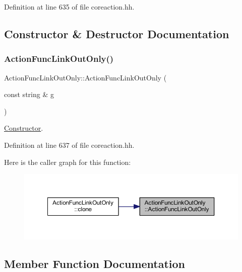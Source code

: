 Definition at line 635 of file coreaction.\+hh.



\subsection{Constructor \& Destructor Documentation}
\mbox{\label{class_action_func_link_out_only_a4c4097e870218f70d23a848a1e79fb78}} 
\subsubsection{\texorpdfstring{ActionFuncLinkOutOnly()}{ActionFuncLinkOutOnly()}}
{\footnotesize\ttfamily Action\+Func\+Link\+Out\+Only\+::\+Action\+Func\+Link\+Out\+Only (\begin{DoxyParamCaption}\item[{const string \&}]{g }\end{DoxyParamCaption})\hspace{0.3cm}{\ttfamily [inline]}}



\mbox{\hyperlink{class_constructor}{Constructor}}. 



Definition at line 637 of file coreaction.\+hh.

Here is the caller graph for this function\+:
\nopagebreak
\begin{figure}[H]
\begin{center}
\leavevmode
\includegraphics[width=350pt]{class_action_func_link_out_only_a4c4097e870218f70d23a848a1e79fb78_icgraph}
\end{center}
\end{figure}


\subsection{Member Function Documentation}
\mbox{\label{class_action_func_link_out_only_a68364ccae05a65b54188cd92c876d01f}} 
